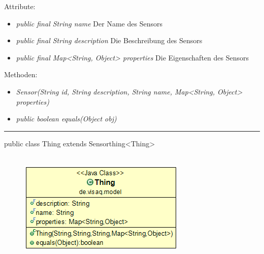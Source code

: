 Attribute:
\begin{itemize}
	\item \emph{public final String name} Der Name des Sensors
	\item \emph{public final String description} Die Beschreibung des Sensors
	\item \emph{public final Map<String, Object> properties} Die Eigenschaften des Sensors
\end{itemize}
Methoden:
\begin{itemize}
	\item \emph{Sensor(String id, String description, String name, Map<String, Object> properties)} 
	\item \emph{public boolean equals(Object obj)} 
\end{itemize}
\clearpage %
\rule{\textwidth}{0.4pt}
public class Thing extends Sensorthing<Thing>
\\\\
\begin{minipage}{0.3\textwidth}
	\begin{figure}[H]
		\includegraphics[scale = 0.5
		]{media/frontend/model/ThingClass.png}
	\end{figure}
\end{minipage} \hfill
\begin{minipage}{0.6\textwidth}
\end{minipage}

